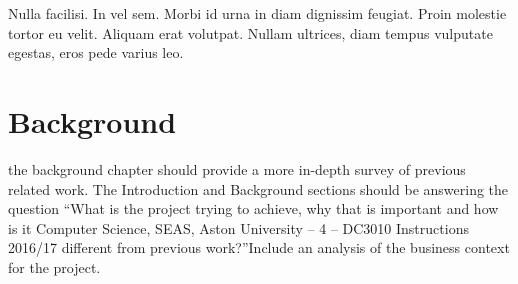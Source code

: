 \begin{savequote}[75mm]
Nulla facilisi. In vel sem. Morbi id urna in diam dignissim feugiat. Proin molestie tortor eu velit. Aliquam erat volutpat. Nullam ultrices, diam tempus vulputate egestas, eros pede varius leo.
\end{savequote}

\chapter{Background}

 the background chapter should provide a more in-depth survey of previous
related work.
The Introduction and Background sections should be answering the question
“What is the project trying to achieve, why that is important and how is it 
Computer Science, SEAS, Aston University – 4 – DC3010 Instructions 2016/17
different from previous work?”Include an analysis of the business context for
the project.